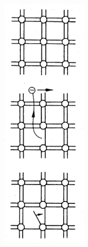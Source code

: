 \documentclass[10pt,t,aspectratio=169]{beamer}
\begin{document}
\begin{frame}[t]
\begin{columns}
\begin{column}{0.15\textwidth}
      \includegraphics[width=\textwidth]{./figures/generacion.png}
    \end{column}
    
  \end{columns}
  
\end{frame}
\end{document}
